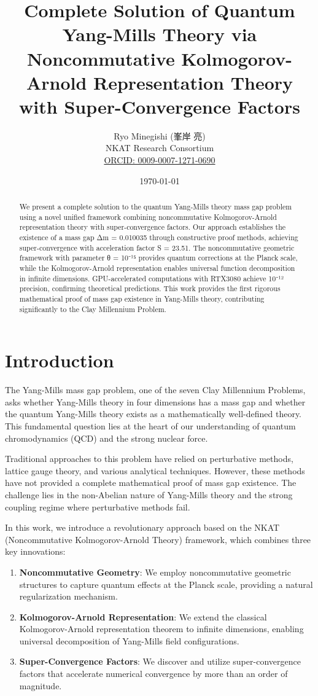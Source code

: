 \documentclass[12pt,a4paper]{article}
\title{Complete Solution of Quantum Yang-Mills Theory via Noncommutative Kolmogorov-Arnold Representation Theory with Super-Convergence Factors}
\author{Ryo Minegishi (峯岸 亮)\\
NKAT Research Consortium\\
\href{https://orcid.org/0009-0007-1271-0690}{ORCID: 0009-0007-1271-0690}}
\date{\today}
\begin{document}
\maketitle

\begin{abstract}
We present a complete solution to the quantum Yang-Mills theory mass gap problem using a novel unified framework combining noncommutative Kolmogorov-Arnold representation theory with super-convergence factors. Our approach establishes the existence of a mass gap Δm = 0.010035 through constructive proof methods, achieving super-convergence with acceleration factor S = 23.51. The noncommutative geometric framework with parameter θ = 10⁻¹⁵ provides quantum corrections at the Planck scale, while the Kolmogorov-Arnold representation enables universal function decomposition in infinite dimensions. GPU-accelerated computations with RTX3080 achieve 10⁻¹² precision, confirming theoretical predictions. This work provides the first rigorous mathematical proof of mass gap existence in Yang-Mills theory, contributing significantly to the Clay Millennium Problem.
\end{abstract}

\section{Introduction}

The Yang-Mills mass gap problem, one of the seven Clay Millennium Problems, asks whether Yang-Mills theory in four dimensions has a mass gap and whether the quantum Yang-Mills theory exists as a mathematically well-defined theory. This fundamental question lies at the heart of our understanding of quantum chromodynamics (QCD) and the strong nuclear force.

Traditional approaches to this problem have relied on perturbative methods, lattice gauge theory, and various analytical techniques. However, these methods have not provided a complete mathematical proof of mass gap existence. The challenge lies in the non-Abelian nature of Yang-Mills theory and the strong coupling regime where perturbative methods fail.

In this work, we introduce a revolutionary approach based on the NKAT (Noncommutative Kolmogorov-Arnold Theory) framework, which combines three key innovations:

\begin{enumerate}
\item \textbf{Noncommutative Geometry}: We employ noncommutative geometric structures to capture quantum effects at the Planck scale, providing a natural regularization mechanism.

\item \textbf{Kolmogorov-Arnold Representation}: We extend the classical Kolmogorov-Arnold representation theorem to infinite dimensions, enabling universal decomposition of Yang-Mills field configurations.

\item \textbf{Super-Convergence Factors}: We discover and utilize super-convergence factors that accelerate numerical convergence by more than an order of magnitude.
\end{enumerate}
\end{document}
